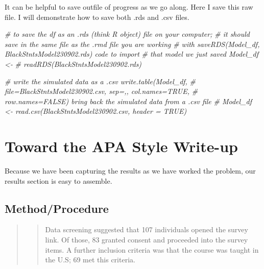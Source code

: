 \documentclass[
  11pt,
]{book}
\newenvironment{Shaded}{\begin{snugshade}}{\end{snugshade}}
\newcommand{\CommentTok}[1]{\textcolor[rgb]{0.37,0.37,0.37}{\textit{#1}}}
\begin{document}
It can be helpful to save outfile of progress as we go along. Here I save this raw file. I will demonstrate how to save both .rds and .csv files.

\begin{Shaded}
\begin{Highlighting}[]
\CommentTok{\# to save the df as an .rds (think \textquotesingle{}R object\textquotesingle{}) file on your computer;}
\CommentTok{\# it should save in the same file as the .rmd file you are working}
\CommentTok{\# with saveRDS(Model\_df, \textquotesingle{}BlackStntsModel230902.rds\textquotesingle{}) code to import}
\CommentTok{\# that model we just saved Model\_df \textless{}{-}}
\CommentTok{\# readRDS(\textquotesingle{}BlackStntsModel230902.rds\textquotesingle{})}
\end{Highlighting}
\end{Shaded}

\begin{Shaded}
\begin{Highlighting}[]
\CommentTok{\# write the simulated data as a .csv write.table(Model\_df,}
\CommentTok{\# file=\textquotesingle{}BlackStntsModel230902.csv\textquotesingle{}, sep=\textquotesingle{},\textquotesingle{}, col.names=TRUE,}
\CommentTok{\# row.names=FALSE) bring back the simulated data from a .csv file}
\CommentTok{\# Model\_df \textless{}{-} read.csv(\textquotesingle{}BlackStntsModel230902.csv\textquotesingle{}, header = TRUE)}
\end{Highlighting}
\end{Shaded}

\hypertarget{toward-the-apa-style-write-up}{%
\section{Toward the APA Style Write-up}\label{toward-the-apa-style-write-up}}

Because we have been capturing the results as we have worked the problem, our results section is easy to assemble.

\hypertarget{methodprocedure}{%
\subsection{Method/Procedure}\label{methodprocedure}}

\begin{quote}
\begin{quote}
Data screening suggested that 107 individuals opened the survey link. Of those, 83 granted consent and proceeded into the survey items. A further inclusion criteria was that the course was taught in the U.S; 69 met this criteria.
\end{quote}
\end{quote}
\end{document}
